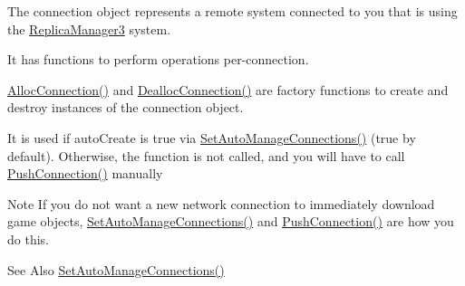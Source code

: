 The connection object represents a remote system connected to you that is using the \hyperlink{class_rak_net_1_1_replica_manager3}{Replica\-Manager3} system.\par
 It has functions to perform operations per-\/connection.\par
 \hyperlink{class_rak_net_1_1_replica_manager3_ade7df800d3dfd31bdd44de76172eb912}{Alloc\-Connection()} and \hyperlink{class_rak_net_1_1_replica_manager3_a78b449c8e3caa9a343a7d273f768687c}{Dealloc\-Connection()} are factory functions to create and destroy instances of the connection object.\par
 It is used if auto\-Create is true via \hyperlink{class_rak_net_1_1_replica_manager3_af7e33dfb956e311cde40a97c9f89dc8e}{Set\-Auto\-Manage\-Connections()} (true by default). Otherwise, the function is not called, and you will have to call \hyperlink{class_rak_net_1_1_replica_manager3_a5497b1ce378391cd617cec81ce7d8b94}{Push\-Connection()} manually\par
 \begin{DoxyNote}{Note}
If you do not want a new network connection to immediately download game objects, \hyperlink{class_rak_net_1_1_replica_manager3_af7e33dfb956e311cde40a97c9f89dc8e}{Set\-Auto\-Manage\-Connections()} and \hyperlink{class_rak_net_1_1_replica_manager3_a5497b1ce378391cd617cec81ce7d8b94}{Push\-Connection()} are how you do this. 
\end{DoxyNote}
\begin{DoxySeeAlso}{See Also}
\hyperlink{class_rak_net_1_1_replica_manager3_af7e33dfb956e311cde40a97c9f89dc8e}{Set\-Auto\-Manage\-Connections()} 
\end{DoxySeeAlso}

